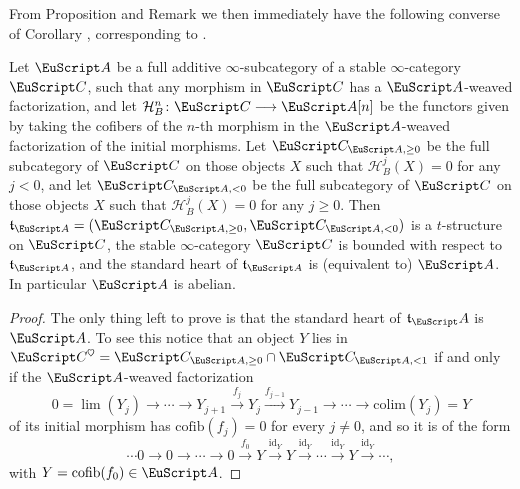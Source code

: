 {From Proposition  and Remark  we then immediately have the following converse of Corollary , corresponding to \cite[Lemma 3.2]{Brid}.
\begin{proposition}\label{to.be.repeated.verbatim}
Let $\cA$ be a full additive $\infty$-subcategory of a stable $\infty$-category $\C$, such that  any morphism in $\C$ has a $\cA$-weaved factorization, and let
$\mathcal{H}^n_B\colon \C\to \cA[n]$ be the functors given by taking the cofibers of the $n$-th morphism in the $\cA$-weaved factorization of the initial morphisms. 
 Let
$\C_{\cA,\geq 0}$ be the full subcategory of $\C$ on those objects $X$ such that $\mathcal{H}^j_B(X)=0$ for any $j< 0$, and let $\C_{\cA,< 0}$ be the full subcategory of $\C$ on those objects $X$ such that $\mathcal{H}^j_B(X)=0$ for any $j\geq 0$. Then $\mathfrak{t}_{\cA}=(\C_{\cA,\geq 0}, \C_{\cA,<0})$ is a $t$-structure on $\C$, the stable $\infty$-category $\C$ is bounded with respect to $\mathfrak{t}_{\cA}$, and the standard heart of $\mathfrak{t}_{\cA}$ is (equivalent to) $\cA$. In particular $\cA$ is abelian.
\end{proposition}
\begin{proof}
The only thing left to prove is that the standard heart of  $\mathfrak{t}_\cA$ is $\cA$. To see this notice that an object $Y$ lies in $\C^\heart=\C_{\cA,\geq 0}\cap \C_{\cA,<1}$ if and only if the $\cA$-weaved factorization
\[
0 =\lim(Y_j)\to\cdots \to Y_{j+1} \xrightarrow{f_{j}} Y_{j} \xrightarrow{f_{j-1}}Y_{j-1}\to \cdots\to \mathrm{colim}(Y_j)=Y
\]
of its initial morphism has $\mathrm{cofib}(f_j)=0$ for every $j\neq0$, and so it is of the form
\[
\cdots 0 \to 0\to \cdots \to 0\xrightarrow{f_{0}} Y \xrightarrow{\mathrm{id}_Y}Y\xrightarrow{\mathrm{id}_Y} \cdots\xrightarrow{\mathrm{id}_Y}Y\xrightarrow{\mathrm{id}_Y}\cdots,\] 
with $Y=\mathrm{cofib}(f_0)\in \cA$.
\end{proof}


}


